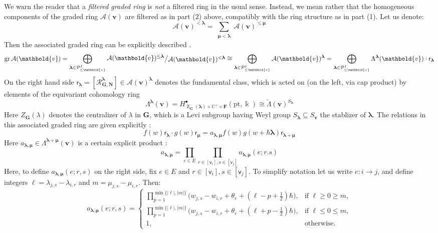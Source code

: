 \documentclass[11pt,reqno]{amsart}
\renewcommand{\mathbf}{\mathbold}
\numberwithin{equation}{section}
\theoremstyle{definition}
\newcommand{\cA}{\mathcal{A}}
\newcommand{\bF}{\mathbf{F}}
\newcommand{\bG}{\mathbf{G}}
\newcommand{\bN}{\mathbf{N}}
\newcommand{\cP}{\mathcal{P}}
\newcommand{\cR}{\mathcal{R}}
\newcommand{\bv}{\mathbf{v}}
\newcommand{\CC}{\mathbb{C}}
\DeclareMathOperator{\gr}{gr}
\newcommand{\pt}{\mathrm{pt}}
\newcommand{\kk}{\Bbbk}
\renewcommand{\bv}{\mathbf{v}} %
\newcommand{\sv}{\mathsf{v}}
\newcommand{\sfr}{{\mathsf{r}}}
\newcommand{\vertexset}{I}
\newcommand{\arrowset}{E}
\newcommand{\GT}{\Lambda}
\newcommand{\tGT}{\widetilde{\Lambda}}
\newcommand{\Partitions}{\cP}
\newcommand{\bla}{{\boldsymbol{\lambda}}}
\newcommand{\bmu}{{\boldsymbol{\mu}}}
\newcommand{\qzast}{\cA}
\begin{document}
We warn the reader that a \emph{filtered graded ring} is \emph{not} a filtered ring in the usual sense. Instead, we mean rather that the homogeneous components of the graded ring  $\qzast(\bv)$ are filtered  as in part (2) above, compatibly with the ring structure as in part (1). Let us  denote:
\begin{equation}
    \qzast(\bv)^{<\bla} = \sum_{\substack{ \bmu < \bla}} \qzast(\bv)^{\leq \bmu}
\end{equation}
Then the associated graded ring can be explicitly described \cite[Proposition 6.2]{BFN1}. 
\begin{equation}
\label{eq: gr ring}
\gr \qzast(\bv) = \bigoplus_{\bla \in \Partitions_{\leq \bv}^{\vertexset}} \raisebox{.1em}{$\qzast(\bv)^{\leq \bla}$} \big/ \raisebox{-0.1em}{$\qzast(\bv)^{<\bla}$} \cong \bigoplus_{\bla \in \Partitions_{\leq \bv}^\vertexset} \qzast(\bv)^{\bla}  = \bigoplus_{\bla \in \Partitions_{\leq \bv}^{\vertexset}} \GT^{\bla}(\bv) \cdot \sfr_{\bla}
\end{equation}
On the right hand side $\sfr_{\bla} = [\cR_{\bG,\bN}^\bla] \in \qzast(\bv)^\bla$ denotes the fundamental class, which is acted on (on the left, via cap product) by elements of the equivariant cohomology ring
\begin{equation}
\label{eq: GT for bla}
\GT^{\bla}(\bv) = H_{\operatorname{Z}_\bG(\bla) \times \CC^\times \times \bF}^\bullet(\pt, \kk) \cong  \tGT(\bv)^{S_{\bla}}
\end{equation}
Here $Z_\bG(\lambda)$ denotes the centralizer of $\lambda$ in $\bG$, which is a Levi subgroup having Weyl group $S_{\bla} \subseteq S_\bv$ the stablizer of $\bla$.  The relations in this associated graded ring are given explicitly \cite[\S 4(ii)]{BFN1}:
\begin{equation}
\label{eq: rels in gr}
f(w) \sfr_\bla \cdot g(w) \sfr_\bmu = a_{\bla, \bmu} f(w) g(w+\hbar \bla) \sfr_{\bla+\bmu}
\end{equation}
Here $a_{\bla, \bmu} \in \GT^{\bla+\bmu}(\bv)$ is a certain explicit product \cite[(4.7)]{BFN1}:
\begin{equation}
    a_{\bla, \bmu} = \prod_{e \in \arrowset} \prod_{r \in [\sv_i], s\in [\sv_j]}a_{\bla,\bmu}(e;r.s)
\end{equation}
Here, to  define $a_{\bla,\bmu}(e; r,s)$ on the right side, fix $e\in E$ and $r\in [\sv_i], s\in [\sv_j]$. To simplify notation let us write $e: i \rightarrow j$, and define integers $\ell = \lambda_{j,s} - \lambda_{i,r}$ and $m = \mu_{j,s}-\mu_{i,r}$. Then:
\begin{equation}
     a_{\bla,\bmu}(e;r,s) = \left\{ 
     \begin{array}{cl} 
     \displaystyle{\prod_{p=1}^{\min\{|\ell|,|m|\}}} \big(w_{j,s}-w_{i,r}+\theta_e + (\ell-p+\tfrac{1}{2})\hbar\big), & \text{if } \ell \geq 0 \geq m, \\ 
     \displaystyle{\prod_{p=1}^{\min\{|\ell|,|m|\}}} \big(w_{j,s}-w_{i,r}+\theta_e + (\ell+p-\tfrac{1}{2})\hbar\big), & \text{if } \ell \leq 0 \leq m, \\ 
     1, & \text{otherwise.}
    \end{array} \right.
\end{equation}
\end{document}
